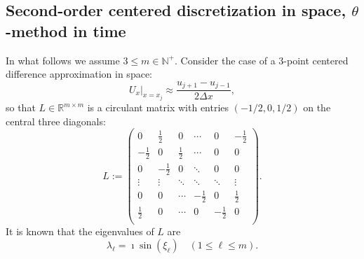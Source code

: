 \documentclass[a4paper]{article}
\newtheorem{lemma}{Lemma}
\newcommand{\dx}{\Delta x}
\newcommand{\nplus}{\mathbb{N}^+}
\begin{document}
\subsection{Second-order centered discretization in space, $\theta$-method in time}\label{sectioncentered}
In what follows we assume $3\le m\in\nplus$. Consider the case of a 3-point centered difference approximation in space:
\[
    U_x\Big|_{x=x_j} \approx \frac{u_{j+1}-u_{j-1}}{2\dx},
\]
so that $L\in\mathbb{R}^{m\times m}$ is a circulant matrix with entries $(-1/2, 0, 1/2)$ on the central
three diagonals:
\begin{equation}\label{Ldef}
L:=\left(
\begin{array}{cccccc}
 0 & \frac{1}{2} & 0  & \cdots & 0 & -\frac{1}{2} \\
 -\frac{1}{2} & 0 & \frac{1}{2} &  \cdots & 0 & 0 \\
 0 & -\frac{1}{2} & 0 &  \ddots & 0 & 0\\
 \vdots  & \vdots  & \ddots  & \ddots & \ddots & \vdots \\
  0 & 0 & \cdots  & -\frac{1}{2} & 0 & \frac{1}{2} \\
 \frac{1}{2} & 0 & \cdots & 0 & -\frac{1}{2} & 0 \\
\end{array}
\right).
\end{equation}
It is known that the eigenvalues of $L$ are 
\begin{equation}\label{Leigenvalues}
\lambda_\ell=\imath \sin(\xi_\ell)\quad (1\le\ell\le m).
\end{equation}
%
\end{document}
